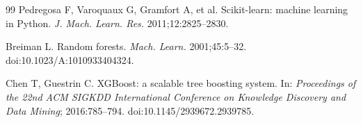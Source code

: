 \begin{thebibliography}{99}
Pedregosa F, Varoquaux G, Gramfort A, et al. Scikit-learn: machine learning in Python. \textit{J. Mach. Learn. Res.} 2011;12:2825--2830.

Breiman L. Random forests. \textit{Mach. Learn.} 2001;45:5--32. doi:10.1023/A:1010933404324.

Chen T, Guestrin C. XGBoost: a scalable tree boosting system. In: \textit{Proceedings of the 22nd ACM SIGKDD International Conference on Knowledge Discovery and Data Mining}; 2016:785--794. doi:10.1145/2939672.2939785.

\end{thebibliography}
